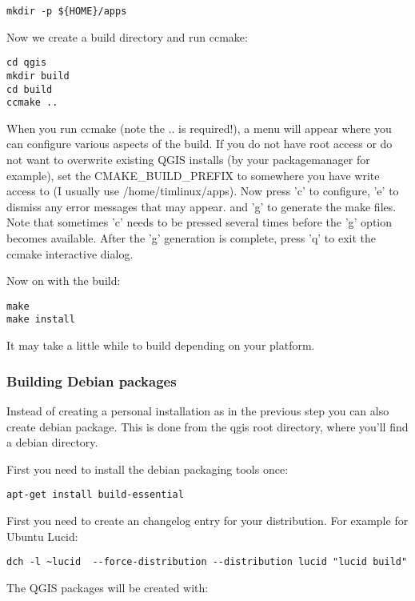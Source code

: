 \begin{verbatim}
mkdir -p ${HOME}/apps 
\end{verbatim}

Now we create a build directory and run ccmake:

\begin{verbatim}
cd qgis
mkdir build
cd build
ccmake ..
\end{verbatim}

When you run ccmake (note the .. is required!), a menu will appear where 
you can configure various aspects of the build. If you do not have root
access or do not want to overwrite existing QGIS installs (by your
packagemanager for example), set the CMAKE\_BUILD\_PREFIX to somewhere you
have write access to (I usually use /home/timlinux/apps). Now press
'c' to configure, 'e' to dismiss any error messages that may appear.
and 'g' to generate the make files. Note that sometimes 'c' needs to 
be pressed several times before the 'g' option becomes available.
After the 'g' generation is complete, press 'q' to exit the ccmake 
interactive dialog.

Now on with the build:

\begin{verbatim}
make
make install
\end{verbatim}

It may take a little while to build depending on your platform.

\hypertarget{toc11}{}
\subsubsection{Building Debian packages}
Instead of creating a personal installation as in the previous step you can
also create debian package.  This is done from the qgis root directory, where
you'll find a debian directory.

First you need to install the debian packaging tools once:

\begin{verbatim}
apt-get install build-essential
\end{verbatim}

First you need to create an changelog entry for your distribution. For example for Ubuntu Lucid:

\begin{verbatim}
dch -l ~lucid  --force-distribution --distribution lucid "lucid build"
\end{verbatim}

The QGIS packages will be created with:

